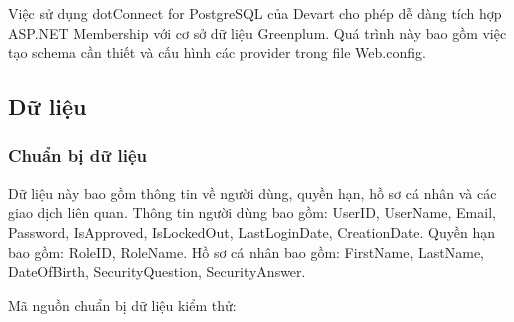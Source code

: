 \documentclass[14pt]{article}
\begin{document}
Việc sử dụng dotConnect for PostgreSQL của Devart cho phép dễ dàng tích hợp ASP.NET Membership với cơ sở dữ liệu Greenplum. Quá trình này bao gồm việc tạo schema cần thiết và cấu hình các provider trong file Web.config.


\subsection{Dữ liệu}

\subsubsection{Chuẩn bị dữ liệu}

Dữ liệu này bao gồm thông tin về người dùng, quyền hạn, hồ sơ cá nhân và các giao dịch liên quan. Thông tin người dùng bao gồm: UserID, UserName, Email, Password, IsApproved, IsLockedOut, LastLoginDate, CreationDate. Quyền hạn bao gồm: RoleID, RoleName. Hồ sơ cá nhân bao gồm: FirstName, LastName, DateOfBirth, SecurityQuestion, SecurityAnswer.

Mã nguồn chuẩn bị dữ liệu kiểm thử:
\end{document}
